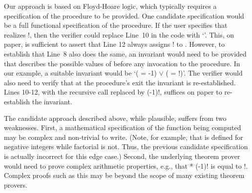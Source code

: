 %
%
%
Our approach is based on Floyd-Hoare logic, which typically
requires a specification of the procedure to be provided. One candidate
specification would be a full functional specification of the
procedure. If the user specifies that  realizes !, then the
verifier could replace Line~10 in the code with `'. This, on
paper, is sufficient to assert that Line 12 always assigns ! to
. However, to establish that Line~8 also does the same, an invariant
would need to be provided that describes the possible values of  before
any invocation to the procedure. In our example, a suitable invariant would
be `( = -1) $\vee$ ( = !)'. The verifier would also need to verify
that at the procedure's exit the invariant is re-established. Lines 10-12,
with the recursive call replaced by (-1)!, suffices on paper to
re-establish the invariant.

The candidate approach described above, while plausible, suffers from
two weaknesses. First, a mathematical specification of the function
being computed may be complex and non-trivial to write. (Note, for example,
that  is defined for negative integers while factorial is not.
Thus, the previous candidate specification is actually incorrect for this edge
case.)
Second, the underlying theorem prover
would need to prove complex arithmetic properties, e.g., that  * (-1)! is
equal to !. Complex proofs such as this may be beyond the scope of many
existing theorem provers.

